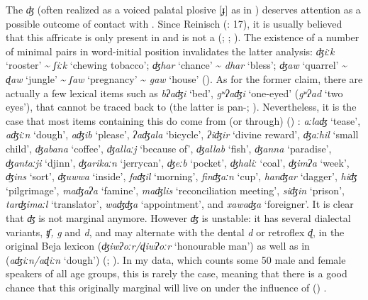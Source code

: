 \documentclass[output=paper]{langsci/langscibook}
\begin{document}
The  \textit{ʤ} (often realized as a voiced palatal plosive [ɟ] as in  ) deserves attention as a possible outcome of contact with . Since Reinisch (\citeyear{Reinisch1893}: 17), it is usually believed that this affricate is only present in   and is not a  (\citealt{Roper1928}; \citealt{Hudson1976}; \citealt{Morin1995}). The existence of a number of minimal pairs in word-initial position invalidates the latter analysis: \textit{ʤiːk} ‘rooster’ {\textasciitilde} \textit{ʃiːk} ‘chewing tobacco’; \textit{ʤhar} ‘chance’ {\textasciitilde} \textit{dhar} ‘bless’; \textit{ʤaw} ‘quarrel’ {\textasciitilde} \textit{ɖaw} ‘jungle’ {\textasciitilde} \textit{ʃaw} ‘pregnancy’ {\textasciitilde} \textit{gaw} ‘house’ (\citealt{Vanhove2017}). As for the former claim, there are actually a few lexical items such as \textit{bʔaʤi} ‘bed’, \textit{gʷʔaʤi} ‘one-eyed’ (\textit{gʷʔad} ‘two eyes’), that cannot be traced back to  (the latter is pan-; \citealt{Blažek2000}). Nevertheless, it is the case that most items containing this  do come from (or through) () : \textit{aːlaʤ} ‘tease’, \textit{aʤiːn} ‘dough’, \textit{aʤib} ‘please’, \textit{ʔaʤala} ‘bicycle’, \textit{ʔiʤir} ‘divine reward’, \textit{ʤaːhil} ‘small child’, \textit{ʤabana} ‘coffee’, \textit{ʤallaːj} ‘because of’, \textit{ʤallab} ‘fish’, \textit{ʤanna} ‘paradise’, \textit{ʤantaːji} ‘djinn’, \textit{ʤarikaːn} ‘jerrycan’, \textit{ʤeːb} ‘pocket’, \textit{ʤhaliː} ‘coal’, \textit{ʤimʔa} ‘week’, \textit{ʤins} ‘sort’, \textit{ʤuwwa} ‘inside’, \textit{faʤil} ‘morning’, \textit{finʤaːn} ‘cup’, \textit{hanʤar} ‘dagger’, \textit{hiʤ} ‘pilgrimage’, \textit{maʤaʔa} ‘famine’, \textit{maʤlis} ‘reconciliation meeting’, \textit{siʤin} ‘prison’, \textit{tarʤimaːl} ‘translator’, \textit{waʤʤa} ‘appointment’, and \textit{xawaʤa} ‘foreigner’. It is clear that \textit{ʤ} is not marginal anymore. However \textit{ʤ} is unstable: it has several dialectal variants, \textit{ʧ,} \textit{g} and \textit{d}, and may alternate with the dental \textit{d} or retroflex \textit{ɖ}, in the original Beja lexicon (\textit{ʤiwʔoːr/ɖiwʔoːr} ‘honourable man’) as well as in  (\textit{aʤiːn/aɖiːn} ‘dough’) (\citealt{VanhoveHamidAhmed2011}; \citealt{Vanhove2017}). In my data, which counts some 50 male and female speakers of all age groups, this is rarely the case, meaning that there is a good chance that this originally marginal  will live on under the influence of () .
\end{document}
